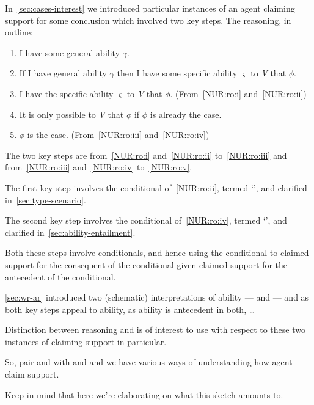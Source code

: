 \begin{note}
  In~\autoref{sec:cases-interest} we introduced particular instances of an agent claiming support for some conclusion which involved two key steps.
  The reasoning, in outline:
  \begin{enumerate}[label=\arabic*., ref=(\arabic*)]
  \item\label{NUR:ro:i} I have some general ability \(\gamma\).
  \item\label{NUR:ro:ii} If I have general ability \(\gamma\) then I have some specific ability \(\varsigma\) to \emph{V} that \(\phi\).
  \item\label{NUR:ro:iii} I have the specific ability \(\varsigma\) to \emph{V} that \(\phi\). \hfill (From~\ref{NUR:ro:i} and~\ref{NUR:ro:ii})
  \item\label{NUR:ro:iv} It is only possible to \emph{V} that \(\phi\) if \(\phi\) is already the case.
  \item\label{NUR:ro:v} \(\phi\) is the case. \hfill (From~\ref{NUR:ro:iii} and~\ref{NUR:ro:iv})
  \end{enumerate}

  The two key steps are from~\ref{NUR:ro:i} and~\ref{NUR:ro:ii} to~\ref{NUR:ro:iii} and from~\ref{NUR:ro:iii} and~\ref{NUR:ro:iv} to~\ref{NUR:ro:v}.

  The first key step involves the conditional of~\ref{NUR:ro:ii}, termed `\gsi{-}', and clarified in~\autoref{sec:type-scenario}.

  The second key step involves the conditional of~\ref{NUR:ro:iv}, termed `', and clarified in~\autoref{sec:ability-entailment}.

  Both these steps involve conditionals, and hence using the conditional to claimed support for the consequent of the conditional given claimed support for the antecedent of the conditional.

  \autoref{sec:wr-ar} introduced two (schematic) interpretations of ability --- \AR{} and \WR{} --- and as both key steps appeal to ability, as ability is antecedent in both, \dots

  Distinction between reasoning \adS{} and \adC{} is of interest to use with respect to these two instances of claiming support in particular.

  So, pair \AR{} and \WR{} with \adS{} and \adC{} and we have various ways of understanding how agent claim support.

  Keep in mind that here we're elaborating on what this sketch amounts to.
\end{note}

